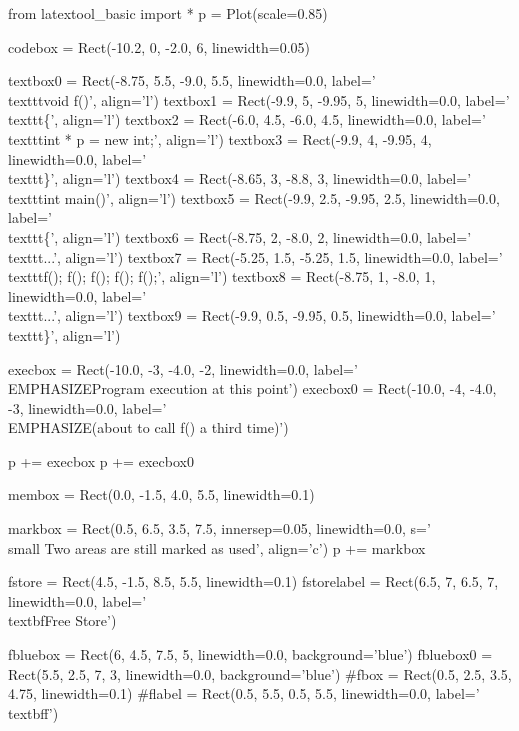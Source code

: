 \begin{python}
from latextool_basic import *
p = Plot(scale=0.85)

codebox = Rect(-10.2, 0, -2.0, 6, linewidth=0.05)

textbox0 = Rect(-8.75, 5.5, -9.0, 5.5, linewidth=0.0, label='\\texttt{void f()}', align='l')
textbox1 = Rect(-9.9, 5, -9.95, 5, linewidth=0.0, label='\\texttt{\{}', align='l')
textbox2 = Rect(-6.0, 4.5, -6.0, 4.5, linewidth=0.0, label='\\texttt{int * p = new int;}', align='l')
textbox3 = Rect(-9.9, 4, -9.95, 4, linewidth=0.0, label='\\texttt{\}}', align='l')
textbox4 = Rect(-8.65, 3, -8.8, 3, linewidth=0.0, label='\\texttt{int main()}', align='l')
textbox5 = Rect(-9.9, 2.5, -9.95, 2.5, linewidth=0.0, label='\\texttt{\{}', align='l')
textbox6 = Rect(-8.75, 2, -8.0, 2, linewidth=0.0, label='\\texttt{...}', align='l')
textbox7 = Rect(-5.25, 1.5, -5.25, 1.5, linewidth=0.0, label='\\texttt{f(); f(); f(); f(); f();}', align='l')
textbox8 = Rect(-8.75, 1, -8.0, 1, linewidth=0.0, label='\\texttt{...}', align='l')
textbox9 = Rect(-9.9, 0.5, -9.95, 0.5, linewidth=0.0, label='\\texttt{\}}', align='l')

execbox = Rect(-10.0, -3, -4.0, -2, linewidth=0.0,
               label='\\EMPHASIZE{Program execution at this point}')
execbox0 = Rect(-10.0, -4, -4.0, -3, linewidth=0.0,
               label='\\EMPHASIZE{(about to call f() a third time)}')

p += execbox
p += execbox0

membox = Rect(0.0, -1.5, 4.0, 5.5, linewidth=0.1)

markbox = Rect(0.5, 6.5, 3.5, 7.5, innersep=0.05, linewidth=0.0, s='{\\small Two areas are still marked as used}', align='c')
p += markbox

fstore = Rect(4.5, -1.5, 8.5, 5.5, linewidth=0.1)
fstorelabel = Rect(6.5, 7, 6.5, 7, linewidth=0.0, label='\\textbf{Free Store}')

fbluebox = Rect(6, 4.5, 7.5, 5, linewidth=0.0, background='blue')
fbluebox0 = Rect(5.5, 2.5, 7, 3, linewidth=0.0, background='blue')
#fbox = Rect(0.5, 2.5, 3.5, 4.75, linewidth=0.1)
#flabel = Rect(0.5, 5.5, 0.5, 5.5, linewidth=0.0, label='\\textbf{f}')


\end{python}

